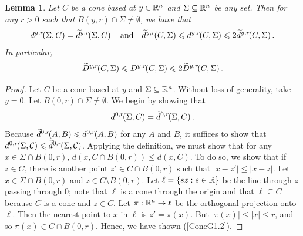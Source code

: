 \documentclass[11pt]{article}
\newtheorem{lemma}[theorem]{Lemma}
\theoremstyle{definition}
\numberwithin{equation}{section}
\newcommand{\cC}{\mathcal{C}}
\newcommand{\D}[3]{D^{#1}\hspace{-3 pt}\left(#2,#3\right)}
\newcommand{\Da}[3]{\twid{D}^{#1}\hspace{-3 pt}\left(#2,#3\right)}
\newcommand{\hd}[3]{d^{#1}\hspace{-3 pt}\left(#2,#3\right)}
\newcommand{\hda}[3]{\twid{d}^{#1}\hspace{-3 pt}\left(#2,#3\right)}
\newcommand{\sleq}{\leqslant}
\newcommand{\twid}[1]{\widetilde{#1}}
\begin{document}
\begin{lemma}\label{ConeG1}
Let $C$ be a cone based at $y\in\mathbb{R}^n$ and $\Sigma\subseteq\mathbb{R}^n$ be any set. Then for any $r>0$ such that $B(y,r)\cap \Sigma\neq \emptyset$, we have that
\begin{equation}\label{ConeG1.-1}
\hd{y,r}\Sigma C= \hda{y,r}\Sigma C\quad\mbox{and}\quad \hda{y,r}C\Sigma\sleq\hd{y,r}C\Sigma\sleq 2\hda{y,r}C\Sigma.
\end{equation}
In particular,
\begin{equation}\label{ConeG1.1}
\Da{y,r}C\Sigma\sleq\D{y,r}C\Sigma\sleq 2\Da{y,r}C\Sigma.
\end{equation}
\end{lemma}
\begin{proof}
Let $C$ be a cone based at $y$ and $\Sigma\subseteq\mathbb{R}^n$. Without loss of generality, take $y = 0$. Let $B(0,r)\cap \Sigma\neq \emptyset$.  We begin by showing that
\begin{equation}\label{ConeG1.2}
\hd{0,r}\Sigma C= \hda{0,r}\Sigma C.\end{equation}
Because $\hda{0,r}AB\sleq\hd{0,r}AB$ for any $A$ and $B$, it suffices to show that $\hd{0,r}\Sigma\cC\sleq\hda{0,r}\Sigma\cC$. Applying the definition, we must show that for any $x\in \Sigma\cap B(0,r)$, $d(x,C\cap B(0,r)) \sleq d(x,C)$. To do so, we show that if $z\in C$, there is another point $z'\in C\cap B(0,r)$ such that $|x-z'|\sleq |x-z|$. Let $x\in \Sigma\cap B(0,r)$ and $z\in C\setminus B(0,r)$. Let $\ell = \{sz:s\in\mathbb{R}\}$ be the line through $z$ passing through 0; note that $\ell$ is a cone through the origin and that $\ell\subseteq C$ because $C$ is a cone and $z\in C$. Let $\pi:\mathbb{R}^n\to\ell$ be the orthogonal projection onto $\ell$. Then the nearest point to $x$ in $\ell$ is $z' = \pi(x)$. But $ | \pi (x) |\sleq |x| \sleq r$, and so $\pi(x)\in C\cap B(0,r)$. Hence, we have shown (\ref{ConeG1.2}).


\end{proof}
\end{document}
